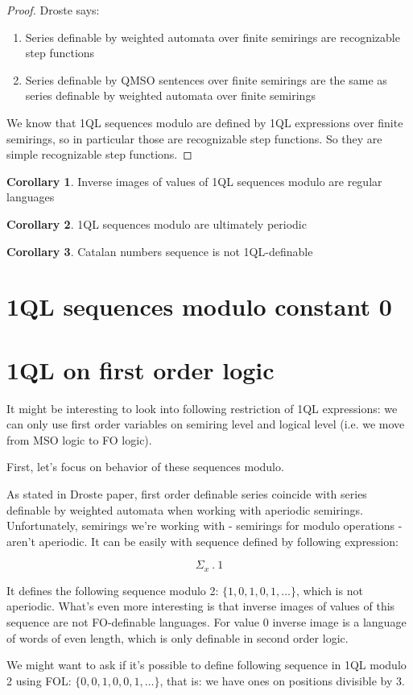 \documentclass[12pt]{article}
\theoremstyle{definition}
\newtheorem{corollary}{Corollary}[section]
\begin{document}
\begin{proof}
    Droste says:
    \begin{enumerate}
        \item Series definable by weighted automata over finite semirings are recognizable step functions
        \item Series definable by QMSO sentences over finite semirings are the same as series definable by weighted automata over finite semirings
    \end{enumerate}
    We know that 1QL sequences modulo are defined by 1QL expressions over finite semirings, so in particular those are recognizable step functions. So they are simple recognizable step functions.
\end{proof}

\begin{corollary}
    Inverse images of values of 1QL sequences modulo are regular languages
\end{corollary}

\begin{corollary}
    1QL sequences modulo are ultimately periodic
\end{corollary}

\begin{corollary}
    Catalan numbers sequence is not 1QL-definable
\end{corollary}

\section{1QL sequences modulo constant 0}

\section{1QL on first order logic}
It might be interesting to look into following restriction of 1QL expressions: we can only use first order variables on semiring level and logical level (i.e. we move from MSO logic to FO logic). 

First, let's focus on behavior of these sequences modulo.

As stated in Droste paper, first order definable series coincide with series definable by weighted automata when working with aperiodic semirings. Unfortunately, semirings we're working with - semirings for modulo operations - aren't aperiodic. It can be easily with sequence defined by following expression:

$$ \Sigma_x \ . \ 1 $$

It defines the following sequence modulo 2: $\{1, 0, 1, 0, 1, \ldots\}$, which is not aperiodic. What's even more interesting is that inverse images of values of this sequence are not FO-definable languages. For value $0$ inverse image is a language of words of even length, which is only definable in second order logic. 

We might want to ask if it's possible to define following sequence in 1QL modulo 2 using FOL: $\{0, 0, 1, 0, 0, 1, \ldots\}$, that is: we have ones on positions divisible by 3. 
\end{document}
